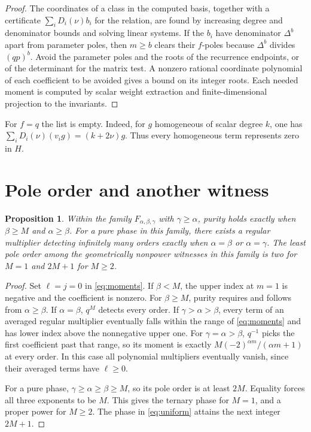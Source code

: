 \documentclass[11pt]{article}
\newtheorem{proposition}[theorem]{Proposition}
\begin{document}
\begin{proof}
The coordinates of a class in the computed basis, together with
a certificate \(\sum_i D_i(\nu)b_i\) for the relation, are found by
increasing degree and denominator bounds and solving linear systems.
If the \(b_i\) have denominator \(\Delta^b\) apart from parameter
poles, then \(m\ge b\) clears their \(f\)-poles because \(\Delta^b\)
divides \((qp)^b\). Avoid the parameter poles and the roots of
the recurrence endpoints, or of the determinant for the matrix
test. A nonzero rational coordinate polynomial of each coefficient
to be avoided gives a bound on its integer roots.
Each needed moment is computed by scalar weight extraction and
finite-dimensional projection to the invariants.
\end{proof}

For \(f=q\) the list is empty. Indeed, for \(g\) homogeneous of scalar
degree \(k\), one has
\(\sum_i D_i(\nu)(v_i g)=(k+2\nu)g\). Thus every homogeneous term
represents zero in \(H\).

\section{Pole order and another witness}\label{sec:poles}

\begin{proposition}\label{prop:product}
Within the family \(F_{\alpha,\beta,\gamma}\) with \(\gamma\ge\alpha\),
purity holds exactly when \(\beta\ge M\) and \(\alpha\ge\beta\).
For a pure phase in this family, there exists a regular multiplier
detecting infinitely many orders exactly when \(\alpha=\beta\)
or \(\alpha=\gamma\). The least pole order among the geometrically
nonpower witnesses in this family is two for \(M=1\) and
\(2M+1\) for \(M\ge2\).
\end{proposition}

\begin{proof}
Set \(\ell=j=0\) in \eqref{eq:moments}. If \(\beta<M\), the
upper index at \(m=1\) is negative and the coefficient is nonzero.
For \(\beta\ge M\), purity requires and follows from
\(\alpha\ge\beta\). If \(\alpha=\beta\), \(q^M\) detects every order.
If \(\gamma>\alpha>\beta\), every term of an averaged regular
multiplier eventually falls within the range of \eqref{eq:moments}
and has lower index above the nonnegative upper one.
For \(\gamma=\alpha>\beta\), \(q^{-1}\) picks the first coefficient
past that range, so its moment is exactly
\(M(-2)^{\alpha m}/(\alpha m+1)\) at every order. In this case all
polynomial multipliers eventually vanish, since their averaged terms
have \(\ell\ge0\).

For a pure phase, \(\gamma\ge\alpha\ge\beta\ge M\), so its pole
order is at least \(2M\). Equality forces all three exponents to
be \(M\). This gives the ternary phase for \(M=1\), and a proper
power for \(M\ge2\). The phase in \eqref{eq:uniform} attains the next
integer \(2M+1\).
\end{proof}
\end{document}
